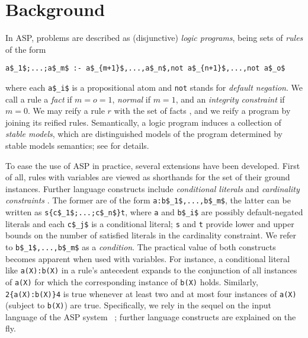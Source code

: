 
\section{Background}\label{sec:background}
 
In ASP, problems are described as (disjunctive) \emph{logic programs}, 
being sets of \emph{rules} of the form
\begin{lstlisting}[mathescape=true,numbers=none]
   a$_1$;...;a$_m$ :- a$_{m+1}$,...,a$_n$,not a$_{n+1}$,...,not a$_o$
\end{lstlisting}
where each \lstinline[mathescape=true]{a$_i$} is a propositional atom %
and
\lstinline[mathescape=true]{not} stands for \emph{default negation}.
%
We call a rule a \emph{fact} if $m=o=1$, 
\emph{normal} if $m=1$, and 
an \emph{integrity constraint} if $m=0$.
%
We may reify a rule $r$ with the set of facts 
, and we reify 
a program by joining its reified rules.
%
Semantically, a logic program induces a collection of \emph{stable models},
which are distinguished models of the program determined by stable models semantics;
see \cite{gellif91a} for details.
 
To ease the use of ASP in practice, 
several extensions have been developed. 
First of all, rules with variables are viewed as shorthands for the set of their ground instances.
Further language constructs include
\emph{conditional literals} and \emph{cardinality constraints} \cite{siniso02a}.
The former are of the form
\lstinline[mathescape=true]{a:b$_1$,...,b$_m$},
the latter can be written as
\lstinline[mathescape=true]+s{c$_1$;...;c$_n$}t+,
where \lstinline{a} and \lstinline[mathescape=true]{b$_i$} are possibly default-negated literals  %
and each \lstinline[mathescape=true]{c$_j$} is a conditional literal; %
\lstinline{s} and \lstinline{t} provide lower and upper bounds on the number of satisfied literals in the cardinality constraint.
We refer to \lstinline[mathescape=true]{b$_1$,...,b$_m$} as a \emph{condition}.
%
The practical value of both constructs becomes apparent when used with variables.
For instance, a conditional literal like
\lstinline[mathescape=true]{a(X):b(X)}
in a rule's antecedent expands to the conjunction of all instances of \lstinline{a(X)} for which the corresponding instance of \lstinline{b(X)} holds.
%
Similarly,
\lstinline[mathescape=true]+2{a(X):b(X)}4+
is true whenever at least two and at most four instances of \lstinline{a(X)} (subject to \lstinline{b(X)}) are true.
%
%
Specifically, 
we rely in the sequel
on the input language of the ASP system \clingo~\cite{gekakasc14b};
further language constructs are explained on the fly.
 

